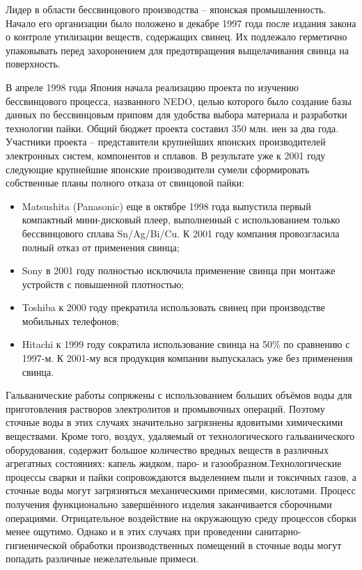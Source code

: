 Лидер в области бессвинцового производства – японская промышленность. Начало его организации было положено в декабре 1997 года
после издания закона о контроле утилизации веществ, содержащих свинец. Их подлежало герметично упаковывать перед захоронением
для предотвращения выщелачивания свинца на поверхность.

В апреле 1998 года Япония начала реализацию проекта по изучению бессвинцового процесса, названного NEDO, целью которого было
создание базы данных по бессвинцовым припоям для удобства выбора материала и разработки технологии пайки.
Общий бюджет проекта составил 350 млн. иен за два года. Участники проекта – представители крупнейших японских
производителей электронных систем, компонентов и сплавов. В результате уже к 2001 году следующие крупнейшие японские
производители сумели сформировать собственные планы полного отказа от свинцовой пайки:
\begin{itemize}
\item Matsushita (Panasonic) еще в октябре 1998 года выпустила первый компактный мини-дисковый плеер, выполненный с
	использованием только бессвинцового сплава Sn/Ag/Bi/Cu. К 2001 году компания провозгласила полный отказ от применения свинца;
\item Sony в 2001 году полностью исключила применение свинца при монтаже устройств с повышенной плотностью;
\item Toshiba к 2000 году прекратила использовать свинец при производстве мобильных телефонов;
\item Hitachi к 1999 году сократила использование свинца на 50\% по сравнению с 1997-м. К 2001-му вся продукция компании
	выпускалась уже без применения свинца.
\end{itemize}

Гальванические работы сопряжены с использованием больших объёмов воды для приготовления растворов электролитов и
промывочных операций. Поэтому сточные воды в этих случаях значительно загрязнены ядовитыми химическими веществами.
Кроме того, воздух, удаляемый от технологического гальванического оборудования, содержит большое количество вредных
веществ в различных агрегатных состояниях: капель жидком, паро- и газообразном.Технологические процессы сварки и
пайки сопровождаются выделением пыли и токсичных газов, а сточные воды могут загрязняться механическими примесями,
кислотами. Процесс получения функционально завершённого изделия заканчивается сборочными операциями. Отрицательное
воздействие на окружающую среду процессов сборки менее ощутимо. Однако и в этих случаях при проведении
санитарно-гигиенической обработки производственных помещений в сточные воды могут попадать различные нежелательные примеси.

